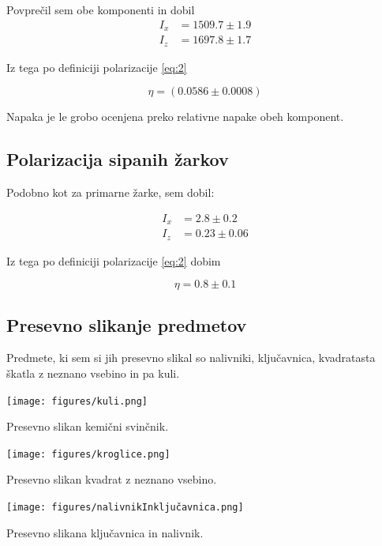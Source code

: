 \documentclass[11pt]{article}
\begin{document}
Povprečil sem obe komponenti in dobil
\begin{align*}
  I_x &= 1509.7 \pm 1.9\\
I_z &= 1697.8 \pm 1.7
\end{align*}

Iz tega po definiciji polarizacije \ref{eq:2}

\[ \eta = (0.0586 \pm 0.0008)
\]

Napaka je le grobo ocenjena preko relativne napake obeh komponent.

\subsection{Polarizacija sipanih žarkov}\label{sec:org9f235ad}

Podobno kot za primarne žarke, sem dobil:

\begin{align*}
  I_x &= 2.8 \pm 0.2 \\
I_z &= 0.23 \pm 0.06
\end{align*}

Iz tega po definiciji polarizacije \ref{eq:2} dobim

\[ \eta = 0.8 \pm 0.1
\]

\subsection{Presevno slikanje predmetov}\label{sec:orgf7768b9}

Predmete, ki sem si jih presevno slikal so nalivniki, ključavnica, kvadratasta škatla z neznano vsebino in pa kuli.

\begin{slika}[H]
\begin{center}
\texttt{[image: figures/kuli.png]}
\end{center}
\caption{\small Presevno slikan kemični svinčnik.}
\end{slika}

\begin{slika}[H]
\begin{center}
\texttt{[image: figures/kroglice.png]}
\end{center}
\caption{\small Presevno slikan kvadrat z neznano vsebino.}
\end{slika}

\begin{slika}[H]
\begin{center}
\texttt{[image: figures/nalivnikInključavnica.png]}
\end{center}
\caption{\small Presevno slikana ključavnica in nalivnik.}
\end{slika}

\printbibliography[heading=bibintoc]
\end{document}
